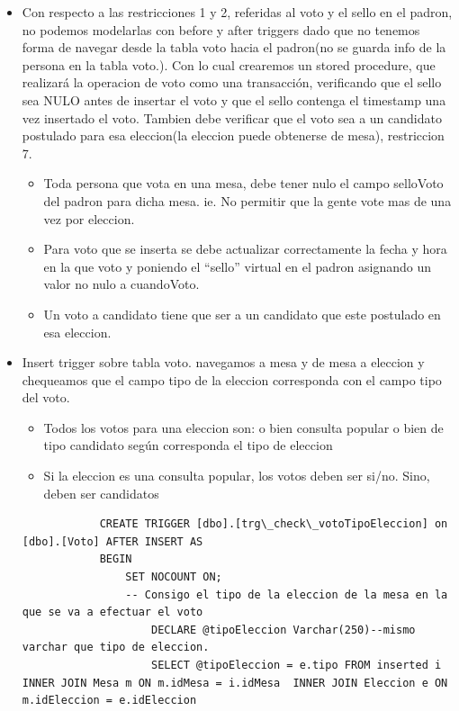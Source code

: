 \begin{itemize}
	\item Con respecto a las restricciones 1 y 2, referidas al voto y el sello en el padron, no podemos modelarlas con before y after triggers dado que no tenemos forma de navegar desde la tabla voto hacia el padron(no se guarda info de la persona en la tabla voto.). Con lo cual crearemos un stored procedure, que realizará la operacion de voto como una transacción, verificando que el sello sea NULO antes de insertar el voto y que el sello contenga el timestamp una vez insertado el voto. Tambien debe verificar que el voto sea a un candidato postulado para esa eleccion(la eleccion puede obtenerse de mesa), restriccion 7.
		\begin{itemize}
			\item Toda persona que vota en una mesa, debe tener nulo el campo selloVoto del padron para dicha mesa. ie. No permitir que la gente vote mas de una vez por eleccion.
			\item Para voto que se inserta se debe actualizar correctamente la fecha y hora en la que voto y poniendo el “sello” virtual en el padron asignando un valor no nulo a cuandoVoto.
			\item Un voto a candidato tiene que ser a un candidato que este postulado en esa eleccion.
		\end{itemize}

	\item Insert trigger sobre tabla voto. navegamos a mesa y de mesa a eleccion y chequeamos que el campo tipo de la eleccion corresponda con el campo tipo del voto.
		\begin{itemize}
			\item Todos los votos para una eleccion son: o bien consulta popular o bien de tipo candidato según corresponda el tipo de eleccion
			\item Si la eleccion es una consulta popular, los votos deben ser si/no. Sino, deben ser candidatos
		\end{itemize}
		\begin{lstlisting}
			CREATE TRIGGER [dbo].[trg\_check\_votoTipoEleccion] on [dbo].[Voto] AFTER INSERT AS 
			BEGIN
				SET NOCOUNT ON;
				-- Consigo el tipo de la eleccion de la mesa en la que se va a efectuar el voto
					DECLARE @tipoEleccion Varchar(250)--mismo varchar que tipo de eleccion.
					SELECT @tipoEleccion = e.tipo FROM inserted i INNER JOIN Mesa m ON m.idMesa = i.idMesa  INNER JOIN Eleccion e ON m.idEleccion = e.idEleccion
					

\end{lstlisting}
\end{itemize}
